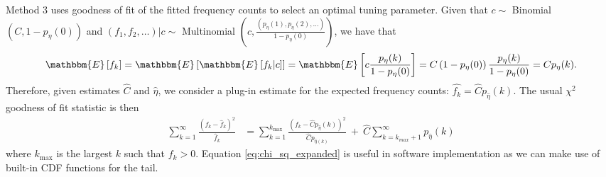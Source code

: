 \documentclass[12pt]{article}
\newcommand{\kmax}{k_{\text{max}}}
\theoremstyle{break}
\theoremstyle{break}
\begin{document}
Method 3 uses goodness of fit of the fitted frequency counts to select an optimal tuning parameter.
Given that $c \sim$ Binomial $\left(C, 1- p_{\eta}(0)\right)$ and $(f_1, f_2, \ldots)|c \sim$  Multinomial $\left(c,  \frac{(p_{\eta}(1), p_{\eta}(2), \ldots)}{1-p_{\eta}(0)}\right)$, we have that
\begin{equation}
 \mathbbm{E}\left[f_k\right] = \mathbbm{E}\left[\mathbbm{E}\left[f_k|c \right]\right] = \mathbbm{E}\left[ c \frac{p_{\eta}(k)}{1-p_{\eta}(0)} \right] = C\left(1-p_{\eta}(0) \right) \frac{p_{\eta}(k)}{1-p_{\eta}(0)} = Cp_{\eta}(k).
\end{equation}
Therefore, given estimates $\widehat{C}$ and $\widehat{\eta}$, we consider a plug-in estimate for the expected frequency counts: $\widehat{f_k} = \widehat{C}p_{\widehat{\eta}}(k)$.  The usual $\chi^2$ goodness of fit statistic is then
\begin{align}
\sum_{k=1}^{\infty} \frac{\left(f_k - \widehat{f}_k \right)^2 }{\widehat{f}_k} %
&= \sum_{k=1}^{\kmax} \frac{\left(f_k - \widehat{C}p_{\widehat{\eta}}(k) \right)^2 }{\widehat{C} p_{\widehat{\eta}(k)}} \ + \ \widehat{C} \sum_{k = k_{max}+1}^{\infty} p_{\widehat{\eta}}(k)
\label{eq:chi_sq_expanded}
\end{align}
where $\kmax$ is the largest $k$ such that $f_k > 0$.
Equation \eqref{eq:chi_sq_expanded} is useful in software implementation as we can make use of built-in CDF functions for the tail.

\end{document}
